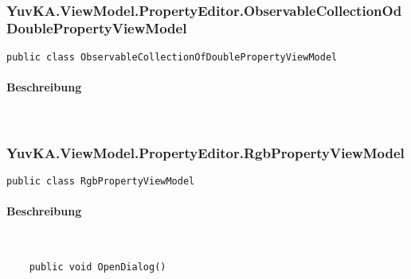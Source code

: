 ~\\




\subsubsection{YuvKA.ViewModel.PropertyEditor.ObservableCollectionOdDoublePropertyViewModel}

\begin{verbatim}
public class ObservableCollectionOfDoublePropertyViewModel
\end{verbatim}

\paragraph{Beschreibung}~\\




\subsubsection{YuvKA.ViewModel.PropertyEditor.RgbPropertyViewModel}

\begin{verbatim}
public class RgbPropertyViewModel
\end{verbatim}

\paragraph{Beschreibung}~\\
\begin{itemize}
	
	\begin{verbatim}
	public void OpenDialog()
	\end{verbatim}

\end{itemize}


